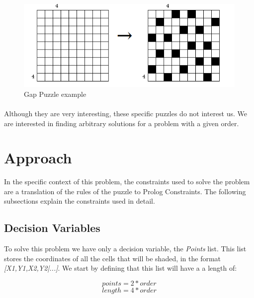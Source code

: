 \documentclass[runningheads]{llncs}
\begin{document}
\begin{figure}
    \begin{center}
        \includegraphics[scale=0.5]{images/figure1.png}
        \caption{Gap Puzzle example} \label{fig1}
    \end{center}
\end{figure}

\paragraph{}
Although they are very interesting, these specific puzzles do not interest us. We are interested in finding arbitrary
solutions for a problem with a given order.

\pagebreak

\section{Approach}
\paragraph{}
In the specific context of this problem, the constraints used to solve the problem are a translation of the rules of
the puzzle to Prolog Constraints. The following subsections explain the constraints used in detail.

\subsection{Decision Variables}
To solve this problem we have only a decision variable, the \textit{Points} list. This list stores the coordinates of all
the cells that will be shaded, in the format \textit{[X1,Y1,X2,Y2|...]}. We start by defining that this list will have a
a length of:

\begin{equation}
    points = 2 * order
\end{equation}
\begin{equation}
    length = 4 * order
\end{equation}
\end{document}
